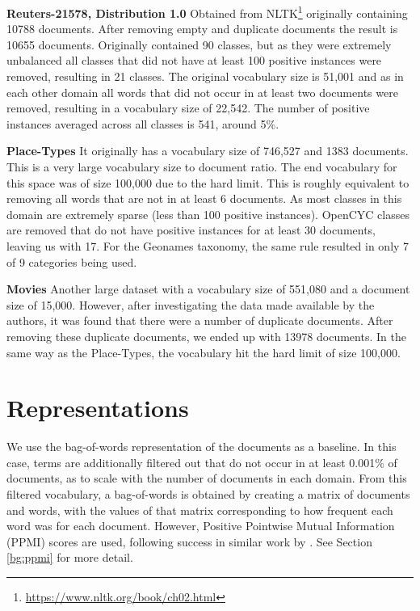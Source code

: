 \textbf{Reuters-21578, Distribution 1.0} Obtained from NLTK\footnote{\url{https://www.nltk.org/book/ch02.html}} originally containing 10788 documents. After removing empty and duplicate documents the result is 10655 documents. Originally contained 90 classes, but as they were extremely unbalanced all classes that did not have at least 100 positive instances were removed, resulting in 21 classes. The original vocabulary size is 51,001 and as in each other domain all words that did not occur in at least two documents were removed, resulting in a vocabulary size of 22,542. The number of positive instances averaged across all classes is 541, around 5\%. 

\textbf{Place-Types} It originally has a vocabulary size of 746,527 and 1383 documents. This is a very large vocabulary size to document ratio. The end vocabulary for this space was of size 100,000 due to the hard limit. This is roughly equivalent to removing all words that are not in at least 6 documents. As most classes in this domain are extremely sparse (less than 100 positive instances). OpenCYC classes are removed that do not have positive instances for at least 30 documents, leaving us with 17. For the Geonames taxonomy, the same rule resulted in only 7 of 9 categories being used.

\textbf{Movies} Another large dataset with a vocabulary size of 551,080 and a document size of 15,000. However, after investigating the data made available by the authors, it was found that there were a number of duplicate documents. After removing these duplicate documents, we ended up with 13978 documents. In the same way as the Place-Types, the vocabulary hit the hard limit of size 100,000. 



\section{Representations}\label{ch25:reps}

We use the bag-of-words representation of the documents as a baseline. In this case, terms are additionally filtered out that do not occur in at least 0.001\% of documents, as to scale with the number of documents in each domain. From this filtered vocabulary, a bag-of-words is obtained by creating a matrix of documents and words, with  the values of that matrix corresponding to how frequent each word was for each document. However,  Positive Pointwise Mutual Information (PPMI) scores are used, following success in similar work by  \cite{Derrac2015}. See Section \ref{bg:ppmi} for more detail.

